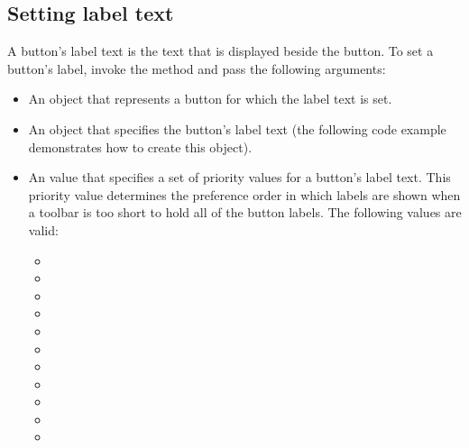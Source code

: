 \documentclass[letterpaper,12pt,english,openany,oneside]{sphinxmanual}
\begin{document}
\subsection{Setting label text}
\label{\detokenize{Plugins_Toolbutton:setting-label-text}}
A button’s label text is the text that is displayed beside the button. To set a button’s label, invoke the  method and pass the following arguments:
\begin{itemize}
\item {} 
An  object that represents a button for which the label text is set.

\item {} 
An  object that specifies the button’s label text (the following code example demonstrates how to create this object).

\item {} 
An  value that specifies a set of priority values for a button’s label text. This priority value determines the preference order in which labels are shown when a toolbar is too short to hold all of the button labels. The following values are valid:
\begin{itemize}
\item {} 

\item {} 

\item {} 

\item {} 

\item {} 

\item {} 

\item {} 

\item {} 

\item {} 

\item {} 

\item {} 

\end{itemize}

\end{itemize}
\end{document}

